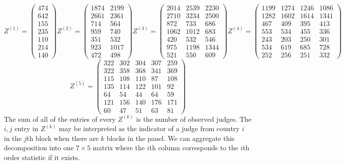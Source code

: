 \documentclass{article}
\begin{document}
\[
Z^{(1)} = \begin{pmatrix} 474 \\  642 \\ 155 \\ 235 \\ 110 \\ 214 \\ 140 \end{pmatrix}
Z^{(2)} = \begin{pmatrix} 1874 & 2199 \\ 2661 & 2361 \\ 714 & 564 \\ 959 & 740 \\ 351 & 532 \\ 923 & 1017 \\ 472 & 498 \end{pmatrix}
Z^{(3)} = \begin{pmatrix} 2014 & 2539 & 2230 \\ 2710 & 3234 & 2500 \\ 872 & 733 & 686 \\ 1062 & 1012 & 683 \\ 420 & 532 & 546 \\ 975 & 1198 & 1344 \\ 521 & 550 & 609 \end{pmatrix}
Z^{(4)} = \begin{pmatrix} 1199 & 1274 & 1246 & 1086 \\ 1282 & 1602 & 1614 & 1341 \\ 467 & 409 & 395 & 413 \\ 553 & 534 & 455 & 336 \\ 243 & 203 & 250 & 301 \\ 534 & 619 & 685 & 728 \\ 252 & 256 & 251 & 332 \end{pmatrix}
\]
\[
Z^{(5)} = \begin{pmatrix} 322 & 302 & 304 & 307 & 259 \\ 322 & 358 & 368 & 341 & 369 \\ 115 & 108 & 110 & 87 & 108 \\ 135 & 114 & 122 & 101 & 92 \\ 
64 & 54 & 44 & 64 & 59 \\ 121 & 156 & 140 & 176 & 171 \\ 60 & 47 & 51 & 63 & 81  \end{pmatrix}
\]The sum of all of the entries of every $Z^{(k)}$ is the number of observed judges. The $i,j$ entry in $Z^{(k)}$ may be interpreted as the indicator of a judge from country $i$ in the $j$th block when there are $k$ blocks in the panel. We can aggregate this decomposition into one $7\times 5$ matrix where the $i$th column corresponds to the $i$th order statistic if it exists.
\end{document}
